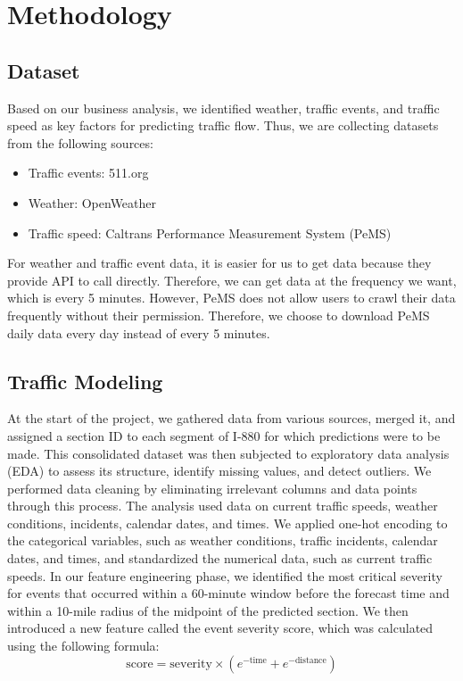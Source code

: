 \section{Methodology}


\subsection{Dataset}
Based on our business analysis, we identified weather, traffic events, and traffic speed as key factors for predicting traffic flow. Thus, we are collecting datasets from the following sources:
\begin{itemize}
    \item Traffic events: 511.org
    \item Weather: OpenWeather
    \item Traffic speed: Caltrans Performance Measurement System (PeMS)
\end{itemize}

For weather and traffic event data, it is easier for us to get data because they provide API to call directly. Therefore, we can get data at the frequency we want, which is every 5 minutes. However, PeMS does not allow users to crawl their data frequently without their permission. Therefore, we choose to download PeMS daily data every day instead of every 5 minutes.

\subsection{Traffic Modeling}
At the start of the project, we gathered data from various sources, merged it, and assigned a section ID to each segment of I-880 for which predictions were to be made. This consolidated dataset was then subjected to exploratory data analysis (EDA) to assess its structure, identify missing values, and detect outliers. We performed data cleaning by eliminating irrelevant columns and data points through this process. The analysis used data on current traffic speeds, weather conditions, incidents, calendar dates, and times. We applied one-hot encoding to the categorical variables, such as weather conditions, traffic incidents, calendar dates, and times, and standardized the numerical data, such as current traffic speeds.
In our feature engineering phase, we identified the most critical severity for events that occurred within a 60-minute window before the forecast time and within a 10-mile radius of the midpoint of the predicted section. We then introduced a new feature called the event severity score, which was calculated using the following formula:
\begin{equation}
    \text{score} = \text{severity} \times \left( e^{-\text{time}} + e^{-\text{distance}} \right)
\end{equation}

